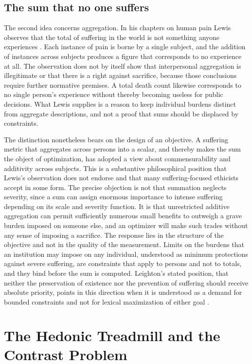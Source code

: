 \documentclass[11pt]{article}
\begin{document}
\subsection{The sum that no one suffers}

The second idea concerns aggregation. In his chapters on human pain Lewis observes that the total of suffering in the world is not something anyone experiences \citep[chaps.~6--7]{lewis1940}. Each instance of pain is borne by a single subject, and the addition of instances across subjects produces a figure that corresponds to no experience at all. The observation does not by itself show that interpersonal aggregation is illegitimate or that there is a right against sacrifice, because those conclusions require further normative premises. A total death count likewise corresponds to no single person's experience without thereby becoming useless for public decisions. What Lewis supplies is a reason to keep individual burdens distinct from aggregate descriptions, and not a proof that sums should be displaced by constraints.

The distinction nonetheless bears on the design of an objective. A suffering metric that aggregates across persons into a scalar, and thereby makes the sum the object of optimization, has adopted a view about commensurability and additivity across subjects. This is a substantive philosophical position that Lewis's observation does not endorse and that many suffering-focused ethicists accept in some form. The precise objection is not that summation neglects severity, since a sum can assign enormous importance to intense suffering depending on its scale and severity function. It is that unrestricted additive aggregation can permit sufficiently numerous small benefits to outweigh a grave burden imposed on someone else, and an optimizer will make such trades without any sense of imposing a sacrifice. The response lies in the structure of the objective and not in the quality of the measurement. Limits on the burdens that an institution may impose on any individual, understood as minimum protections against severe suffering, are constraints that apply to persons and not to totals, and they bind before the sum is computed. Leighton's stated position, that neither the preservation of existence nor the prevention of suffering should receive absolute priority, points in this direction when it is understood as a demand for bounded constraints and not for lexical maximization of either goal \citep{leighton2023,leighton2026}.

\section{The Hedonic Treadmill and the Contrast Problem}
\end{document}

